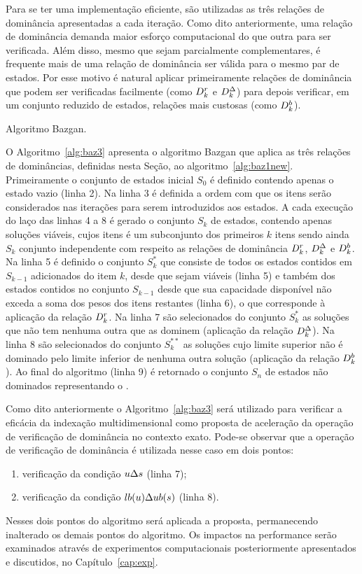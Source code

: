 Para se ter uma implementação eficiente, são utilizadas as três relações de
dominância apresentadas a cada iteração.
Como dito anteriormente, uma relação de dominância demanda maior
esforço computacional do que outra para ser verificada.
Além disso, mesmo que sejam parcialmente complementares,
é frequente mais de uma relação de dominância ser válida para o mesmo par de estados.
Por esse motivo é natural aplicar primeiramente relações de dominância que
podem ser verificadas facilmente (como $D_k^r$ e $D_k^{\Delta}$)
para depois verificar, em um conjunto reduzido de estados, relações mais
custosas (como $D_k^{b}$).

\begin{algorithm}
  \footnotesize
  
  \caption{Algoritmo Bazgan.}
  \label{alg:baz3}
\end{algorithm}

O Algoritmo~\ref{alg:baz3} apresenta o algoritmo Bazgan que aplica as três relações
de dominâncias, definidas nesta Seção, ao algoritmo~\ref{alg:baz1new}.
Primeiramente o conjunto de estados inicial $S_0$ é definido contendo apenas o estado
vazio (linha 2).
Na linha 3 é definida a ordem com que os itens serão considerados nas iterações
para serem introduzidos aos estados.
A cada execução do laço das linhas 4 a 8 é gerado o conjunto $S_k$ de estados,
contendo apenas soluções viáveis, cujos itens é um subconjunto dos primeiros $k$ itens
sendo ainda $S_k$ conjunto independente com respeito as relações de dominância
$D_k^r$, $D_k^{\Delta}$ e $D_k^{b}$.
Na linha 5 é definido o conjunto $S_k^{*}$ que consiste de
todos os estados contidos em $S_{k-1}$ adicionados do item $k$,
desde que sejam viáveis (linha 5) e também dos estados
contidos no conjunto $S_{k-1}$ desde que sua capacidade disponível não exceda a soma
dos pesos dos itens restantes (linha 6), o que corresponde à aplicação da relação $D_k^r$.
Na linha 7 são selecionados do conjunto $S_k^{*}$ as soluções que não tem nenhuma
outra que as dominem (aplicação da relação $D_k^{\Delta}$).
Na linha 8 são selecionados do conjunto $S_k^{**}$ as soluções cujo limite superior não é
dominado pelo limite inferior de nenhuma outra solução (aplicação da relação $D_k^{b}$).
Ao final do algoritmo (linha 9) é retornado o conjunto $S_n$ de estados não dominados
representando o \paretoset{}.

Como dito anteriormente o Algoritmo~\ref{alg:baz3} será utilizado para verificar
a eficácia da indexação multidimensional como proposta de aceleração da operação
de verificação de dominância no contexto exato.
Pode-se observar que a operação de verificação de dominância é utilizada
nesse caso em dois pontos:
\begin{enumerate}[itemsep=-1pt, topsep=1pt]
  \item{ verificação da condição $u \Delta s$ (linha 7);}
  \item{ verificação da condição $lb(u) \Delta ub(s)$ (linha 8).}
\end{enumerate}
\noindent Nesses dois pontos do algoritmo será aplicada a proposta,
permanecendo inalterado os demais pontos do algoritmo.
Os impactos na performance serão examinados através de experimentos
computacionais posteriormente apresentados e discutidos, no Capítulo~\ref{cap:exp}.

